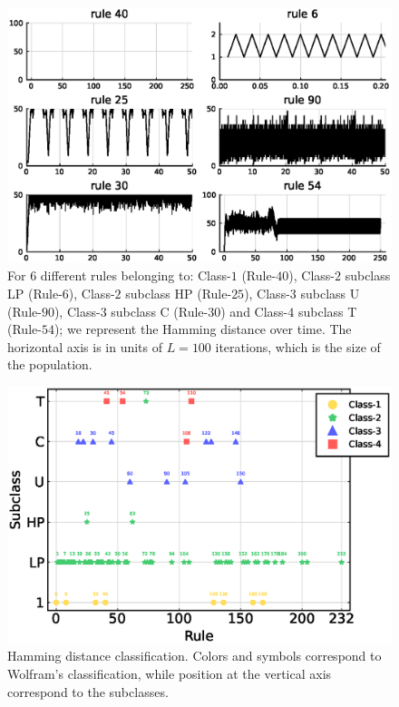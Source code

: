 \begin{figure}
    \centering
    \includegraphics[width=\textwidth]{Images/P4/HammingTimeSeries.eps}
    \caption{For 6 different rules belonging to: Class-$1$ (Rule-$40$), Class-$2$ subclass LP (Rule-$6$), Class-$2$ subclass HP (Rule-$25$), Class-$3$ subclass U (Rule-$90$), Class-$3$ subclass C (Rule-$30$) and Class-$4$ subclass T (Rule-$54$); we represent the Hamming distance over time. The horizontal axis is in units of $L=100$ iterations, which is the size of the population.}
    \label{fig:HammDistTimeSeries}
\end{figure}


\begin{figure}
    \centering
    \includegraphics[width=\linewidth]{Images/P4/HammingClass.eps}
    \caption{Hamming distance classification. Colors and symbols correspond to Wolfram's classification, while position at the vertical axis correspond to the subclasses.}
    \label{fig:HammDistClass}
\end{figure}



